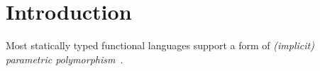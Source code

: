 \section{Introduction}

Most statically typed functional languages support a form of
\emph{(implicit) parametric polymorphism}~\cite{reynolds1983types}.


